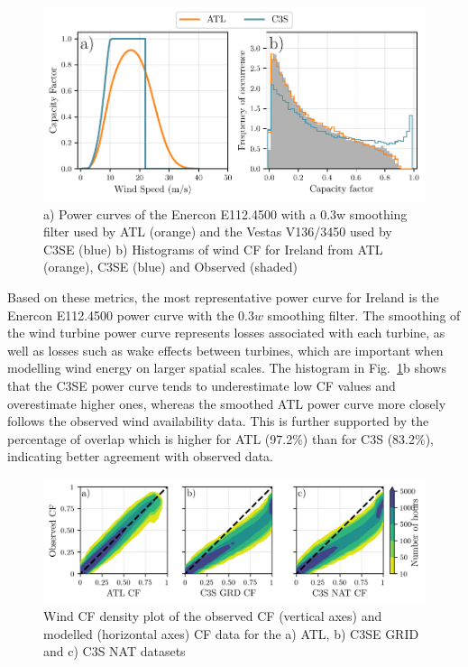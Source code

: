 \documentclass[preprint, 12pt]{elsarticle}
\begin{document}
\begin{figure}[!ht]
	\centering
	\includegraphics[width=\textwidth]{verification_power_curve.pdf}
	\caption{a) Power curves of the Enercon E112.4500 with a 0.3w smoothing filter used by ATL (orange) and the Vestas V136/3450 used by C3SE (blue) b) Histograms of wind CF for Ireland from ATL (orange), C3SE (blue) and Observed (shaded)}
	\label{fig:power_curve}
\end{figure}

Based on these metrics, the most representative power curve for Ireland is the Enercon E112.4500 power curve with the $0.3w$ smoothing filter. The smoothing of the wind turbine power curve represents losses associated with each turbine, as well as losses such as wake effects between turbines, which are important when modelling wind energy on larger spatial scales. The histogram in Fig.~\ref{fig:power_curve}b shows that the C3SE power curve tends to underestimate low CF values and overestimate higher ones, whereas the smoothed ATL power curve more closely follows the observed wind availability data. This is further supported by the percentage of overlap which is higher for ATL (97.2\%) than for C3S (83.2\%), indicating better agreement with observed data.

\begin{figure}[!ht]
	\centering
	\includegraphics[width=\textwidth]{verification_wind_contour.png}
	\caption{Wind CF density plot of the observed CF (vertical axes) and modelled (horizontal axes) CF data for the a) ATL, b) C3SE GRID and c) C3S NAT datasets}
	\label{fig:wind_verification_contour}
\end{figure}
\end{document}
